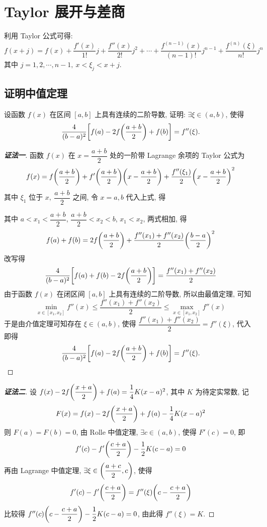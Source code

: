 \section{Taylor 展开与差商}

\begin{theorem}
    利用 Taylor 公式可得:
    $$f\left( x+j\right) =f(x) +\dfrac{f'(x) }{1!}j+\dfrac{f''(x) }{2!}j^{2}+\cdots +\dfrac{f^{\left( n-1\right) }(x) }{\left( n-1\right) !}j^{n-1}+\dfrac{f^{(n) }(\xi ) }{n!}j^{n}$$
    其中 $j=1,2,\cdots,n-1,~x<\xi_j<x+j.$
\end{theorem}

\subsection{证明中值定理}

\begin{example}
    设函数 $f(x)$ 在区间 $[a,b]$ 上具有连续的二阶导数, 证明: $\exists\xi\in(a,b)$, 使得
    $$\dfrac{4}{(b-a)^2}\qty[f(a)-2f\qty(\dfrac{a+b}{2})+f(b)]=f''(\xi).$$
\end{example}
\begin{proof}[{\songti \textbf{证法一}}]
    函数 $f(x)$ 在 $x=\dfrac{a+b}{2}$ 处的一阶带 Lagrange 余项的 Taylor 公式为
    $$f(x)=f\qty(\dfrac{a+b}{2})+f'\qty(\dfrac{a+b}{2})\qty(x-\dfrac{a+b}{2})+\dfrac{f''(\xi_1)}{2}\qty(x-\dfrac{a+b}{2})^2$$
    其中 $\xi_1$ 位于 $x,~\dfrac{a+b}{2}$ 之间, 令 $x=a,b$ 代入上式, 得
    其中 $a<x_1<\dfrac{a+b}{2}$, $\dfrac{a+b}{2}<x_2<b$, $x_1<x_2$, 两式相加, 得
    $$f(a)+f(b)=2f\qty(\dfrac{a+b}{2})+\dfrac{f''(x_1)+f''(x_2)}{2}\qty(\dfrac{b-a}{2})^2$$
    改写得 $$\dfrac{4}{(b-a)^2}\qty[f(a)+f(b)-2f\qty(\dfrac{a+b}{2})]=\dfrac{f''(x_1)+f''(x_2)}{2}$$
    由于函数 $f(x)$ 在闭区间 $[a,b]$ 上具有连续的二阶导数, 所以由最值定理, 可知
    $$\min_{x\in[x_1,x_2]}f''(x)\leqslant \dfrac{f''(x_1)+f''(x_2)}{2}\leqslant \max_{x\in[x_1,x_2]}f''(x)$$
    于是由介值定理可知存在 $\xi\in(a,b)$, 使得 $\displaystyle \dfrac{f''(x_1)+f''(x_2)}{2}=f''(\xi)$, 
    代入即得 $$\dfrac{4}{(b-a)^2}\qty[f(a)-2f\qty(\dfrac{a+b}{2})+f(b)]=f''(\xi).$$
\end{proof}
\begin{proof}[{\songti \textbf{证法二}}]
    设 $f(x)-2f\qty(\dfrac{x+a}{2})+f(a)=\dfrac{1}{4}K(x-a)^2$, 其中 $K$ 为待定实常数, 记
    $$F(x)=f(x)-2f\qty(\dfrac{x+a}{2})+f(a)-\dfrac{1}{4}K(x-a)^2$$
    则 $F(a)=F(b)=0$, 由 Rolle 中值定理, $\exists c\in(a,b)$, 使得 $F'(c)=0$, 即
    $$f'(c)-f'\qty(\dfrac{c+a}{2})-\dfrac{1}{2}K(c-a)=0$$
    再由 Lagrange 中值定理, $\exists \xi\in\qty(\dfrac{a+c}{2},c)$, 使得
    $$f'(c)-f'\qty(\dfrac{c+a}{2})=f''(\xi)\qty(c-\dfrac{c+a}{2})$$
    比较得 $f''(c)\qty(c-\dfrac{c+a}{2})-\dfrac{1}{2}K(c-a)=0$, 由此得 $f''(\xi)=K.$
\end{proof}

